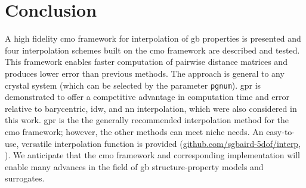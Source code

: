 \documentclass[preprint,12pt]{elsarticle}
\begin{document}
\begin{figure}
{    %
    }
    \label{fig:runtime}
\end{figure}

\section{Conclusion} \label{sec:conclusion}

A high fidelity \gls{cmo} framework for interpolation of \gls{gb} properties is presented and four interpolation schemes built on the \gls{cmo} framework are described and tested. This framework enables faster computation of pairwise distance matrices and produces lower error than previous methods.
The approach is general to any crystal system (which can be selected by the parameter \texttt{pgnum}). \Gls{gpr} is demonstrated to offer a competitive advantage in computation time and error relative to barycentric, \gls{idw}, and \gls{nn} interpolation, which were also considered in this work. \Gls{gpr} is the the generally recommended interpolation method for the \gls{cmo} framework; however, the other methods can meet niche needs. An easy-to-use, versatile interpolation function is provided (\url{github.com/sgbaird-5dof/interp}, \cite{bairdFiveDegreeofFreedom5DOF2020}). We anticipate that the \gls{cmo} framework and corresponding implementation will enable many advances in the field of \gls{gb} structure-property models and surrogates.
    

    
\end{document}
